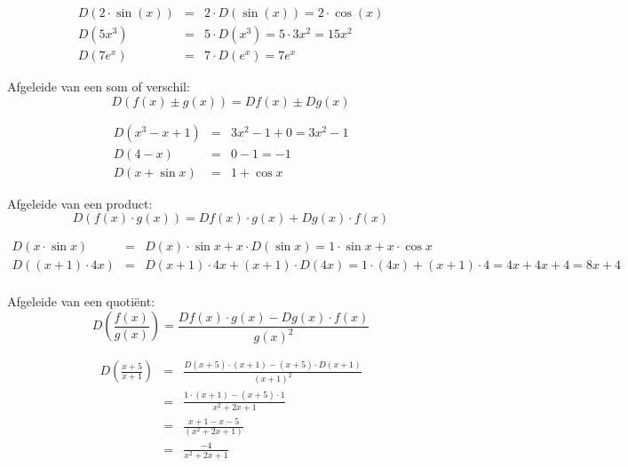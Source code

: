\begin{voorbeeld}
\begin{eqnarray*}
D(2 \cdot \sin (x))&=&2 \cdot D(\sin (x))=2 \cdot \cos (x) \\
D(5x^3)&=&5\cdot D(x^3)=5\cdot 3x^2=15x^2\\
D(7e^x)&=& 7 \cdot D(e^x) =7e^x
\end{eqnarray*}
\end{voorbeeld}

\begin{ftrekenregel}
	Afgeleide van een som of verschil:
	\begin{equation*}
	D(f(x)\pm g(x)) = Df(x) \pm Dg(x)
	\end{equation*}
\end{ftrekenregel}

\begin{voorbeeld}
\begin{eqnarray*}
D(x^3-x+1)&=& 3x^2-1+0=3x^2-1\\
D(4-x)&=&0-1=-1\\
D(x+\sin x)&=&1+\cos x
\end{eqnarray*}
\end{voorbeeld}

\begin{ftrekenregel}
	Afgeleide van een product: 
	\begin{equation*}
	D(f(x) \cdot g(x)) = Df(x) \cdot g(x) + Dg(x) \cdot f(x)
	\end{equation*}
\end{ftrekenregel}

\begin{voorbeeld}
\begin{eqnarray*}
	D(x \cdot  \sin x)&=& D(x)\cdot \sin x + x \cdot D(\sin x) = 1 \cdot \sin x + x \cdot \cos x\\
	D((x+1)\cdot 4x)&=&D(x+1)\cdot 4x+(x+1)\cdot D(4x)=1 \cdot (4x)+(x+1)\cdot 4 = 4x+4x+4=8x+4\\
\end{eqnarray*}
\end{voorbeeld}

\begin{ftrekenregel}
	Afgeleide van een quoti\"ent: 
	\begin{equation*}
	D(\frac{f(x)}{g(x)}) = \frac{Df(x) \cdot g(x) - Dg(x) \cdot f(x)}{g(x)^2}
	\end{equation*}
\end{ftrekenregel}

\begin{voorbeeld}
\begin{eqnarray*}
D(\frac{x+5}{x+1}) &=& \frac{D(x+5)\cdot (x+1)-(x+5)\cdot D(x+1)}{(x+1)^2} \\
&=& \frac{1 \cdot (x+1)-(x+5)\cdot 1}{x^2+2x+1} \\
&=& \frac{x+1-x-5}{(x^2+2x+1)}\\
&=& \frac{-4}{x^2+2x+1}
\end{eqnarray*}
\end{voorbeeld}

